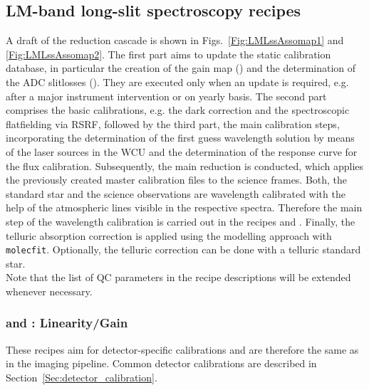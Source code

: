 \clearpage
\subsection{LM-band long-slit spectroscopy recipes}
\label{ssec:recipes_lss_lm}

A draft of the reduction cascade is shown in
Figs.~\ref{Fig:LMLssAssomap1} and \ref{Fig:LMLssAssomap2}. The first part aims to update the static calibration database, in particular the creation of the gain map () and the determination of the \ac{ADC} slitlosses (). They are executed only when an update is required, e.g. after a major instrument intervention or on yearly basis. The second part comprises the basic calibrations, e.g. the dark correction and the spectroscopic flatfielding via \ac{RSRF}, followed by the third part, the main calibration steps, incorporating the determination of the first guess wavelength solution by means of the laser sources in the \ac{WCU} and the determination of the response curve for the flux calibration. Subsequently, the main reduction is conducted, which applies the previously created master calibration files to the science frames. Both, the standard star and the science observations are wavelength calibrated with the help of the atmospheric lines visible in the respective spectra. Therefore the main step of the wavelength calibration is carried out in the recipes  and . Finally, the telluric absorption correction is applied using the modelling approach with \texttt{molecfit}. Optionally, the telluric correction can be done with a telluric standard star.\\
Note that the list of \ac{QC} parameters in the recipe descriptions will be extended whenever necessary.\\

\subsubsection{ and : Linearity/Gain}
These recipes aim for detector-specific calibrations and are therefore the same as in the imaging pipeline. Common detector calibrations are described in Section~\ref{Sec:detector_calibration}.


